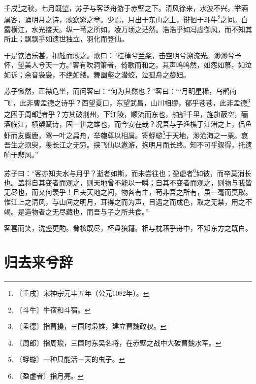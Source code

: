 \documentclass[12pt,UTF-8,openany]{ctexbook}
\begin{document}
\begin{normalsize}
    
    壬戌\footnote{〔壬戌〕宋神宗元丰五年（公元1082年）。}之秋，七月既望，苏子与客泛舟游于赤壁之下。清风徐来，水波不兴。举酒属客，诵明月之诗，歌窈窕之章。少焉，月出于东山之上，徘徊于斗牛\footnote{〔斗牛〕牛宿和斗宿。}之间。白露横江，水光接天。纵一苇之所如，凌万顷之茫然。浩浩乎如冯虚御风，而不知其所止；飘飘乎如遗世独立，羽化而登仙。
    
    于是饮酒乐甚，扣舷而歌之。歌曰：“桂棹兮兰桨，击空明兮溯流光。渺渺兮予怀，望美人兮天一方。”客有吹洞箫者，倚歌而和之。其声呜呜然，如怨如慕，如泣如诉；余音袅袅，不绝如缕。舞幽壑之潜蛟，泣孤舟之嫠妇。
    
    苏子愀然，正襟危坐，而问客曰：“何为其然也？”客曰：“‘月明星稀，乌鹊南飞’，此非曹孟德之诗乎？西望夏口，东望武昌，山川相缪，郁乎苍苍，此非孟德\footnote{〔孟德〕指曹操，三国时枭雄，建立曹魏政权。}之困于周郎\footnote{〔周郎〕指周瑜，三国时东吴名将，在赤壁之战中大破曹魏水军。}者乎？方其破荆州，下江陵，顺流而东也，舳舻千里，旌旗蔽空，酾酒临江，横槊赋诗，固一世之雄也，而今安在哉？况吾与子渔樵于江渚之上，侣鱼虾而友麋鹿，驾一叶之扁舟，举匏尊以相属。寄蜉蝣\footnote{〔蜉蝣〕一种只能活一天的虫子。}于天地，渺沧海之一粟。哀吾生之须臾，羡长江之无穷。挟飞仙以遨游，抱明月而长终。知不可乎骤得，托遗响于悲风。”
    
    苏子曰：“客亦知夫水与月乎？逝者如斯，而未尝往也；盈虚者\footnote{〔盈虚者〕指月亮。}如彼，而卒莫消长也。盖将自其变者而观之，则天地曾不能以一瞬；自其不变者而观之，则物与我皆无尽也，而又何羡乎！且夫天地之间，物各有主，苟非吾之所有，虽一毫而莫取。惟江上之清风，与山间之明月，耳得之而为声，目遇之而成色，取之无禁，用之不竭。是造物者之无尽藏也，而吾与子之所共食。”
    
    客喜而笑，洗盏更酌。肴核既尽，杯盘狼籍。相与枕藉乎舟中，不知东方之既白。
\end{normalsize}



\chapter{归去来兮辞}
\end{document}

